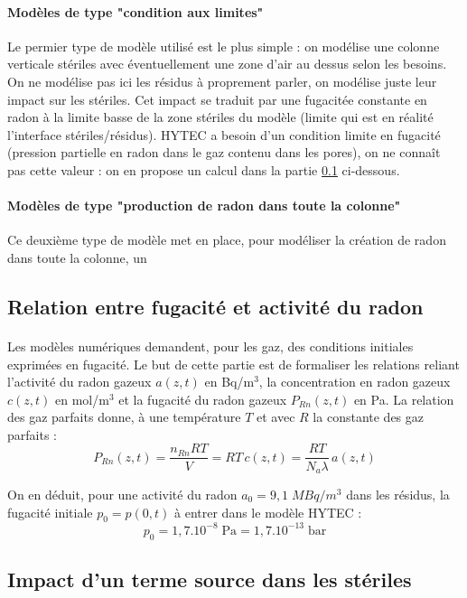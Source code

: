 \documentclass{article}
\begin{document}
\paragraph{Modèles de type "condition aux limites" } Le permier type de modèle utilisé est le plus simple : on modélise une colonne verticale stériles avec éventuellement une zone d'air au dessus selon les besoins. On ne modélise pas ici les résidus à proprement parler, on modélise juste leur impact sur les stériles. Cet impact se traduit par une fugacitée constante en radon à la limite basse de la zone stériles du modèle (limite qui est en réalité l'interface stériles/résidus). HYTEC a besoin d'un condition limite en fugacité (pression partielle en radon dans le gaz contenu dans les pores), on ne connaît pas cette valeur : on en propose un calcul dans la partie \ref{annexe:fug_act} ci-dessous.

\paragraph{Modèles de type "production de radon dans toute la colonne"}Ce deuxième type de modèle met en place, pour modéliser la création de radon dans toute la colonne, un


\subsection{Relation entre fugacité et activité du radon}
\label{annexe:fug_act}
\paragraph{}Les modèles numériques demandent, pour les gaz, des conditions initiales exprimées en fugacité. Le but de cette partie est de formaliser les relations reliant l’activité du radon gazeux $a(z,t)$ en Bq/m$^3$, la concentration en radon gazeux $c(z,t)$ en mol/m$^3$ et la fugacité du radon gazeux $P_{Rn} (z,t)$ en Pa. La relation des gaz parfaits donne, à une température $T$ et avec $R$ la constante des gaz parfaits :
$$
P_{Rn} (z,t)=\frac{n_{Rn} RT}{V}=RT\,c(z,t)=\frac{RT}{N_a \lambda}\, a(z,t)
$$

On en déduit, pour une activité du radon $a_0=9,1 \; MBq/m^3$ dans les résidus, la fugacité initiale $p_0=p(0,t)$ à entrer dans le modèle HYTEC :
$$
p_0=1,7 .10^{-8} \; \text{Pa}=1,7 .10^{-13} \; \text{bar}
$$

\subsection{Impact d'un terme source dans les stériles}
\label{annexe:termesource}
\end{document}
